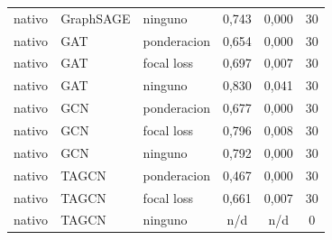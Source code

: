 \begin{longtable}{lllccc}
nativo & GraphSAGE & ninguno & 0,743 & 0,000 & 30 \\
nativo & GAT & ponderacion & 0,654 & 0,000 & 30 \\
nativo & GAT & focal loss & 0,697 & 0,007 & 30 \\
nativo & GAT & ninguno & 0,830 & 0,041 & 30 \\
nativo & GCN & ponderacion & 0,677 & 0,000 & 30 \\
nativo & GCN & focal loss & 0,796 & 0,008 & 30 \\
nativo & GCN & ninguno & 0,792 & 0,000 & 30 \\
nativo & TAGCN & ponderacion & 0,467 & 0,000 & 30 \\
nativo & TAGCN & focal loss & 0,661 & 0,007 & 30 \\
nativo & TAGCN & ninguno & n/d & n/d & 0 \\
\end{longtable}
